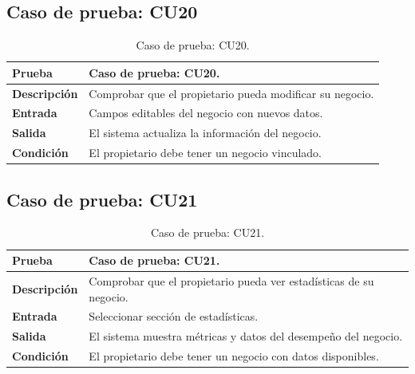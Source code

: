 
\subsection{Caso de prueba: CU20}

\begin{table}[ht]
\centering
\renewcommand{\arraystretch}{1.3}
\begin{tabular}{|p{3cm}|p{12cm}|}
\hline
\rowcolor[RGB]{191,191,191}
\textbf{Prueba} & Caso de prueba: CU20. \\
\hline
\textbf{Descripción} \cellcolor[RGB]{217,217,217} & Comprobar que el propietario pueda modificar su negocio. \\
\hline
\textbf{Entrada} \cellcolor[RGB]{217,217,217} & Campos editables del negocio con nuevos datos. \\
\hline
\textbf{Salida} \cellcolor[RGB]{217,217,217} & El sistema actualiza la información del negocio. \\
\hline
\textbf{Condición} \cellcolor[RGB]{217,217,217} & El propietario debe tener un negocio vinculado. \\
\hline
\end{tabular}
\caption{Caso de prueba: CU20.}
\label{tab:cu20_black_test}
\end{table}


\subsection{Caso de prueba: CU21}

\begin{table}[ht]
\centering
\renewcommand{\arraystretch}{1.3}
\begin{tabular}{|p{3cm}|p{12cm}|}
\hline
\rowcolor[RGB]{191,191,191}
\textbf{Prueba} & Caso de prueba: CU21. \\
\hline
\textbf{Descripción} \cellcolor[RGB]{217,217,217} & Comprobar que el propietario pueda ver estadísticas de su negocio. \\
\hline
\textbf{Entrada} \cellcolor[RGB]{217,217,217} & Seleccionar sección de estadísticas. \\
\hline
\textbf{Salida} \cellcolor[RGB]{217,217,217} & El sistema muestra métricas y datos del desempeño del negocio. \\
\hline
\textbf{Condición} \cellcolor[RGB]{217,217,217} & El propietario debe tener un negocio con datos disponibles. \\
\hline
\end{tabular}
\caption{Caso de prueba: CU21.}
\label{tab:cu21_black_test}
\end{table}

